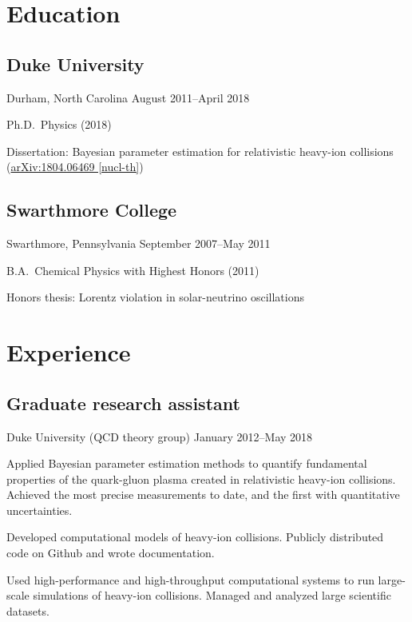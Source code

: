 \documentclass[letterpaper,10pt]{article}
\begin{document}
\begin{multicols}{2}

\section{Education}

\subsection{Duke University}
\vspace{-\parskip}
{\small Durham, North Carolina \hfill August 2011--April 2018}

Ph.D.\ Physics (2018)

Dissertation: Bayesian parameter estimation for relativistic heavy-ion collisions
(\href{https://arxiv.org/abs/1804.06469}{arXiv:1804.06469 [nucl-th]})

\subsection{Swarthmore College}
\vspace{-\parskip}
{\small Swarthmore, Pennsylvania \hfill September 2007--May 2011}

B.A.\ Chemical Physics with Highest Honors (2011)

Honors thesis: Lorentz violation in solar-neutrino oscillations


\section{Experience}

\subsection{Graduate research assistant}
\vspace{-\parskip}
{\small Duke University (QCD theory group) \hfill January 2012--May 2018}

Applied Bayesian parameter estimation methods to quantify fundamental properties of the quark-gluon plasma created in relativistic heavy-ion collisions.
Achieved the most precise measurements to date, and the first with quantitative uncertainties.

Developed computational models of heavy-ion collisions.
Publicly distributed code on Github and wrote documentation.

Used high-performance and high-throughput computational systems to run large-scale simulations of heavy-ion collisions.
Managed and analyzed large scientific datasets.


\end{multicols}
\end{document}
